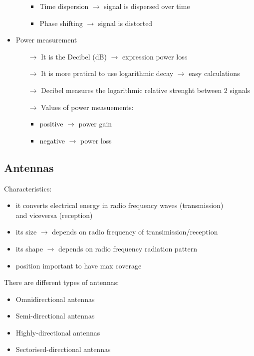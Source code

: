 \begin{itemize}
\begin{itemize}
\begin{itemize}
            \item Time dispersion $\rightarrow$ signal is dispersed over time
            \item Phase shifting $\rightarrow$ signal is distorted
        \end{itemize}
    \end{itemize}
    \item Power measurement
    \begin{itemize}
        \item[$\rightarrow$] It is the Decibel (dB) $\rightarrow$ expression
        power loss
        \item[$\rightarrow$] It is more pratical to use logarithmic decay
        $\rightarrow$ easy calculations
        \item[$\rightarrow$] Decibel measures the logarithmic relative strenght
        between 2 signals
        \item[$\rightarrow$] Values of power measuements:
        \begin{itemize}
            \item positive $\rightarrow$ power gain
            \item negative $\rightarrow$ power loss
        \end{itemize}
    \end{itemize}
\end{itemize}

\subsection{Antennas}

Characteristics:
\begin{itemize}
    \item it converts electrical energy in radio
    frequency waves (transmission)\\and viceversa (reception)
    \item its size $\rightarrow$ depends on radio
    frequency of transimission/reception
    \item its shape $\rightarrow$ depends on radio
    frequency radiation pattern
    \item position important to have max coverage
\end{itemize}

There are different types of antennas:
\begin{itemize}
    \item Omnidirectional antennas
    \item Semi-directional antennas
    \item Highly-directional antennas
    \item Sectorised-directional antennas
\end{itemize} 
